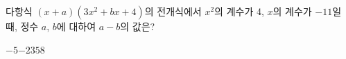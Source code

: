 다항식 $(x+a)(3x^2+bx+4)$의 전개식에서 $x^2$의 계수가 4, $x$의 계수가 $-11$일 때, 정수 $a$, $b$에 대하여 $a-b$의 값은?
\begin{choices32}{$-5$}{$-2$}{$3$}{$5$}{$8$}\end{choices32}
